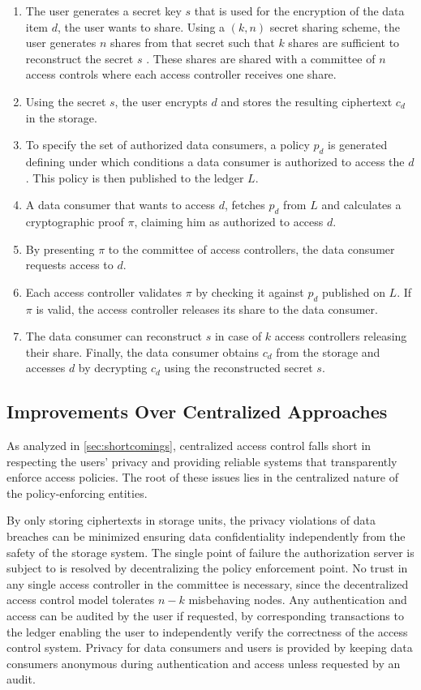 \documentclass[conference]{IEEEtran}
\begin{document}
\begin{enumerate}
  \item The user generates a secret key $s$ that is used for the encryption of the data item $d$, the user wants to share.
  Using a $(k,n)$ secret sharing scheme, the user generates $n$ shares from that secret such that $k$ shares are sufficient to reconstruct the secret $s$ \cite{shamir_how_1979}.
  These shares are shared with a committee of $n$ access controls where each access controller receives one share.
  \item Using the secret $s$, the user encrypts  $d$ and stores the resulting ciphertext $c_d$ in the storage.
  \item To specify the set of authorized data consumers, a policy $p_d$ is generated defining under which conditions a data consumer is authorized to access the $d$.
  This policy is then published to the ledger $L$.
  \item A data consumer that wants to access $d$, fetches $p_d$ from $L$ and calculates a cryptographic proof $\pi$, claiming him as authorized to access $d$.
  \item By presenting $\pi$ to the committee of access controllers, the data consumer requests access to $d$.
  \item Each access controller validates $\pi$ by checking it against $p_d$ published on $L$.
  If $\pi$ is valid, the access controller releases its share to the data consumer.
  \item The data consumer can reconstruct $s$ in case of $k$ access controllers releasing their share.
  Finally, the data consumer obtains $c_d$ from the storage and accesses $d$ by decrypting $c_d$ using the reconstructed secret $s$. 
\end{enumerate}

\subsection{Improvements Over Centralized Approaches}
As analyzed in \autoref{sec:shortcomings}, centralized access control falls short in respecting the users' privacy and providing reliable systems that transparently enforce access policies.
The root of these issues lies in the centralized nature of the policy-enforcing entities.

By only storing ciphertexts in storage units, the privacy violations of data breaches can be minimized ensuring data confidentiality independently from the safety of the storage system. The single point of failure the authorization server is subject to is resolved by decentralizing the policy enforcement point.
No trust in any single access controller in the committee is necessary, since the decentralized access control model tolerates $n - k$ misbehaving nodes.
Any authentication and access can be audited by the user if requested, by corresponding transactions to the ledger enabling the user to independently verify the correctness of the access control system.
Privacy for data consumers and users is provided by keeping data consumers anonymous during authentication and access unless requested by an audit.
\end{document}
